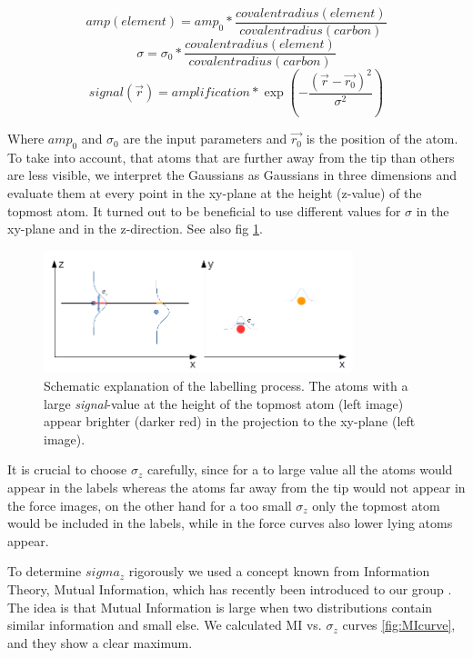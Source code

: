 \documentclass{article}
\begin{document}
\begin{equation}
amp(element) = amp_0 * \frac{covalent radius(element)}{covalent radius(carbon)}
\end{equation}
\begin{equation}
\sigma = \sigma_0 * \frac{covalent radius(element)}{covalent radius(carbon)}
\end{equation}
\begin{equation}
signal(\vec{r}) = amplification*\exp(-\frac{(\vec{r}-\vec{r_0})^2}{\sigma^2})
\end{equation}

Where $amp_0$ and $\sigma_0$ are the input parameters and $\vec{r_0}$ is the position of the atom. To take into account, that atoms that are further away from the tip than others are less visible, we interpret the Gaussians as Gaussians in three dimensions and evaluate them at every point in the xy-plane at the height (z-value) of the topmost atom. It turned out to be beneficial to use different values for $\sigma$ in the xy-plane and in the z-direction. See also fig \ref{fig:gaussians}.

 \begin{figure}[htbp]
 	\begin{center}
 		\includegraphics[width=9cm]{figs/gaussians.png}
 		\caption{Schematic explanation of the labelling process. The atoms with a large \emph{signal}-value at the height of the topmost atom (left image) appear brighter (darker red) in the projection to the xy-plane (left image).}
 		\label{fig:gaussians}
 	\end{center}
 \end{figure}

It is crucial to choose $\sigma_z$ carefully, since for a to large value all the atoms would appear in the labels whereas the atoms far away from the tip would not appear in the force images, on the other hand for a too small $\sigma_z$ only the topmost atom would be included in the labels, while in the force curves also lower lying atoms appear.

To determine $sigma_z$ rigorously we used a concept known from Information Theory, Mutual Information, which has recently been introduced to our group \cite{MIestimator}. The idea is that Mutual Information is large when two distributions contain similar information and small else. We calculated MI vs. $\sigma_z$ curves \ref{fig:MIcurve}, and they show a clear maximum.
\end{document}
